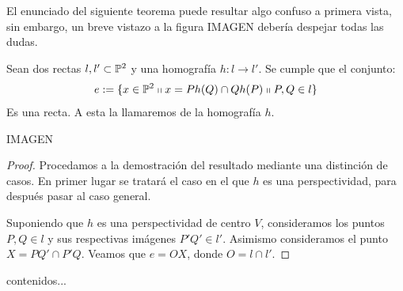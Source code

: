 El enunciado del siguiente teorema puede resultar algo confuso a primera vista, sin embargo, un breve vistazo a la figura IMAGEN debería despejar todas las dudas.
\begin{theo}
	\label{C7_teo_eje}
	Sean dos rectas $l,l'\subset\mathbb{P}^2$ y una homografía $h:l\to l'$. Se cumple que el conjunto:
	\[e:=\{x\in\mathbb{P}^2\shortparallel x=Ph(Q)\cap Qh(P)\shortparallel P,Q\in l\}\]
	Es una recta. A esta la llamaremos  de la homografía $h$. 
	
	IMAGEN
	
\end{theo}
\begin{proof}
	Procedamos a la demostración del resultado mediante una distinción de casos. En primer lugar se tratará el caso en el que $h$ es una perspectividad, para después pasar al caso general.
	
	Suponiendo que $h$ es una perspectividad de centro $V$, consideramos los puntos $P,Q\in l$ y sus respectivas imágenes $P'Q'\in l'$. Asimismo consideramos el punto $X=PQ'\cap P'Q$. Veamos que $e=OX$, donde $O=l\cap l'$.
\end{proof}
\begin{obs}
	contenidos...
\end{obs}
